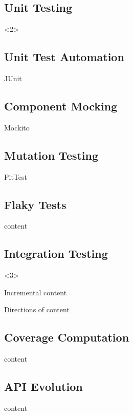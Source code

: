 \subsection{Unit Testing}
\begin{frame}<2>{\insertsubsection}
	\slideStagesTesting
\end{frame}


\subsection{Unit Test Automation}
\begin{frame}{\insertsubsection}
	JUnit
\end{frame}

\subsection{Component Mocking}
\begin{frame}{\insertsubsection}
	Mockito
\end{frame}

\subsection{Mutation Testing}
\begin{frame}{\insertsubsection}
	PitTest
\end{frame}

\subsection{Flaky Tests}
\begin{frame}{\insertsubsection}
	content
\end{frame}


\subsection{Integration Testing}
\begin{frame}<3>{\insertsubsection}
	\slideStagesTesting
\end{frame}

\begin{frame}{Incremental \insertsubsection}
	content
\end{frame}

\begin{frame}{Directions of \insertsubsection}
	content
\end{frame}

\subsection{Coverage Computation}
\begin{frame}{\insertsubsection}
	content
\end{frame}


\subsection{API Evolution}
\begin{frame}{\insertsubsection}
	content
\end{frame}

